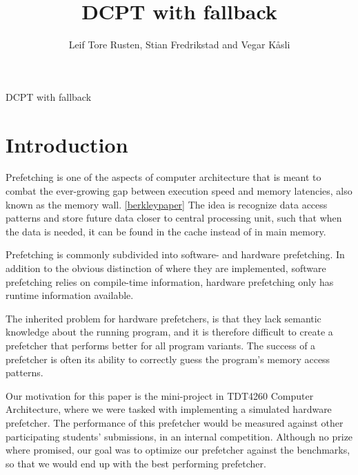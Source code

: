\documentclass[12pt,journal,compsoc]{IEEEtran}
\begin{document}
\title{DCPT with fallback}
\author{Leif Tore Rusten,
        Stian Fredrikstad and
        Vegar K\aa sli}

%
{DCPT with fallback}


\maketitle
\IEEEdisplaynotcompsoctitleabstractindextext
\IEEEpeerreviewmaketitle

\section{Introduction}
Prefetching is one of the aspects of computer architecture that is meant to
combat the ever-growing gap between execution speed and memory latencies, also
known as the memory wall. \ref{berkleypaper} The idea is recognize data access
patterns and store future data closer to central processing unit, such that when
the data is needed, it can be found in the cache instead of in main memory.

Prefetching is commonly subdivided into software- and hardware prefetching.
In addition to the obvious distinction of where they are implemented,
software prefetching relies on compile-time information, hardware
prefetching only has runtime information available.

The inherited problem for hardware prefetchers, is that they lack semantic
knowledge about the running program, and it is therefore difficult to create a
prefetcher that performs better for all program variants. The success of a
prefetcher is often its ability to correctly guess the program's memory
access patterns. 

Our motivation for this paper is the mini-project in TDT4260 Computer
Architecture, where we were tasked with implementing a simulated hardware
prefetcher. The performance of this prefetcher would be measured against other
participating students' submissions, in an internal competition. Although no
prize where promised, our goal was to optimize our prefetcher against the
benchmarks, so that we would end up with the best performing prefetcher.
\end{document}
